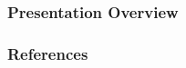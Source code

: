 \documentclass[
	11pt, %
	aspectratio=169, %
]{beamer}
\begin{document}

\begin{frame}
	\titlepage %
\end{frame}



\begin{frame}
	\frametitle{Presentation Overview} %
	
	\tableofcontents %
\end{frame}







\begin{frame}[allowframebreaks]%
	\frametitle{References}
\printbibliography
\end{frame}
\end{document}
